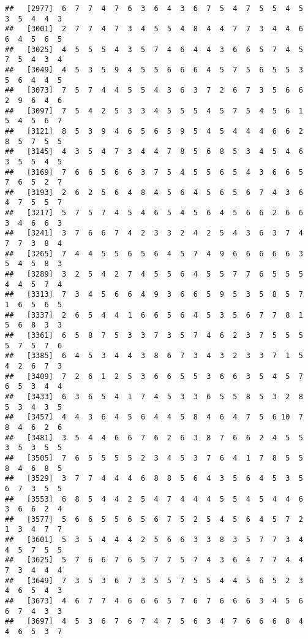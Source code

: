 \documentclass[
]{book}
\begin{document}
\begin{verbatim}
##   [2977]  6  7  7  4  7  6  3  6  4  3  6  7  5  4  7  5  5  4  5  3  5  4  4  3
##   [3001]  2  7  7  4  7  3  4  5  5  4  8  4  4  7  7  3  4  4  6  6  4  5  6  5
##   [3025]  4  5  5  5  4  3  5  7  4  6  4  4  3  6  6  5  7  4  5  7  5  4  3  4
##   [3049]  4  5  3  5  9  4  5  5  6  6  6  4  5  7  5  6  5  5  3  5  6  4  4  5
##   [3073]  7  5  7  4  4  5  5  4  3  6  3  7  2  6  7  3  5  6  6  2  9  6  4  6
##   [3097]  7  5  4  2  5  3  3  4  5  5  5  4  5  7  5  4  5  6  1  5  4  5  6  7
##   [3121]  8  5  3  9  4  6  5  6  5  9  5  4  5  4  4  4  6  6  2  8  5  7  5  5
##   [3145]  4  3  5  4  7  3  4  4  7  8  5  6  8  5  3  4  5  4  6  3  5  5  4  5
##   [3169]  7  6  6  5  6  6  3  7  5  4  5  5  6  5  4  3  6  6  5  7  6  5  2  7
##   [3193]  2  6  2  5  6  4  8  4  5  6  4  5  6  5  6  7  4  3  6  4  7  5  5  7
##   [3217]  5  7  5  7  4  5  4  6  5  4  5  6  4  5  6  6  2  6  6  3  4  6  6  3
##   [3241]  3  7  6  6  7  4  2  3  3  2  4  2  5  4  3  6  3  7  4  7  7  3  8  4
##   [3265]  7  4  4  5  5  6  5  6  4  5  7  4  9  6  6  6  6  6  3  5  4  5  8  3
##   [3289]  3  2  5  4  2  7  4  5  5  6  4  5  5  7  7  6  5  5  5  4  4  5  7  4
##   [3313]  7  3  4  5  6  6  4  9  3  6  6  5  9  5  3  5  8  5  7  1  6  5  6  5
##   [3337]  2  6  5  4  4  1  6  6  5  6  4  5  3  5  6  7  7  8  1  5  6  8  3  3
##   [3361]  6  5  8  7  5  3  3  7  3  5  7  4  6  2  3  7  5  5  5  5  7  5  7  6
##   [3385]  6  4  5  3  4  4  3  8  6  7  3  4  3  2  3  3  7  1  5  4  2  6  7  3
##   [3409]  7  2  6  1  2  5  3  6  6  5  5  3  6  6  3  5  4  5  7  6  5  3  4  4
##   [3433]  6  3  6  5  4  1  7  4  5  3  3  6  5  5  8  5  3  2  8  5  3  4  3  5
##   [3457]  4  4  3  6  4  5  6  4  4  5  8  4  6  4  7  5  6 10  7  8  4  6  2  6
##   [3481]  3  5  4  4  6  6  7  6  2  6  3  8  7  6  6  2  4  5  5  3  5  3  5  5
##   [3505]  7  6  5  5  5  5  2  3  4  5  3  7  6  4  1  7  8  5  5  8  4  6  8  5
##   [3529]  3  7  7  4  4  4  6  8  8  5  6  4  3  5  6  4  5  3  5  6  7  3  5  5
##   [3553]  6  8  5  4  4  2  5  4  7  4  4  4  5  5  4  5  4  4  6  3  6  6  2  4
##   [3577]  5  6  6  5  5  6  5  6  7  5  2  5  4  5  6  4  5  7  2  1  3  4  7  7
##   [3601]  5  3  5  4  4  4  2  5  6  6  3  3  8  3  5  7  7  3  4  4  5  7  5  5
##   [3625]  5  7  6  6  7  6  5  7  7  5  7  4  3  6  4  7  7  4  4  7  3  4  4  4
##   [3649]  7  3  5  3  6  7  3  5  5  7  5  5  4  4  5  6  5  2  3  4  6  5  4  3
##   [3673]  4  6  7  7  4  6  6  6  5  7  6  7  6  6  6  3  4  5  6  6  7  4  3  3
##   [3697]  4  5  3  6  7  6  7  4  7  5  6  3  4  7  6  6  6  8  4  4  6  5  3  7

\end{verbatim}
\end{document}
